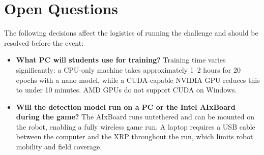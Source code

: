 \documentclass[11pt,a4paper]{article}
\begin{document}
\section{Open Questions}

The following decisions affect the logistics of running the challenge and should be resolved before the event:

\begin{itemize}
    \item \textbf{What PC will students use for training?} Training time varies significantly: a CPU-only machine takes approximately 1--2 hours for 20 epochs with a nano model, while a CUDA-capable NVIDIA GPU reduces this to under 10 minutes. AMD GPUs do not support CUDA on Windows.

    \item \textbf{Will the detection model run on a PC or the Intel AIxBoard during the game?} The AIxBoard runs untethered and can be mounted on the robot, enabling a fully wireless game run. A laptop requires a USB cable between the computer and the XRP throughout the run, which limits robot mobility and field coverage.
\end{itemize}



\end{document}
